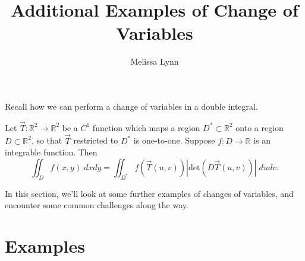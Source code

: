 \documentclass{ximera}
\title{Additional Examples of Change of Variables}
\author{Melissa Lynn}
\begin{document}
  
\begin{abstract}  
\end{abstract}  
\maketitle  

Recall how we can perform a change of variables in a double integral.

\begin{proposition}
Let $\vec{T}:\mathbb{R}^2\rightarrow\mathbb{R}^2$ be a $C^1$ function which maps a region $D^*\subset\mathbb{R}^2$ onto a region $D\subset\mathbb{R}^2$, so that $\vec{T}$ restricted to $D^*$ is one-to-one. Suppose $f:D\rightarrow\mathbb{R}$ is an integrable function. Then
\[
\iint_D f(x,y)\;dxdy = \iint_{D^*} f(\vec{T}(u,v))\left|\text{det}(D\vec{T}(u,v))\right|\;dudv.
\]
\end{proposition}

In this section, we'll look at some further examples of changes of variables, and encounter some common challenges along the way.

\section*{Examples}
\end{document}
